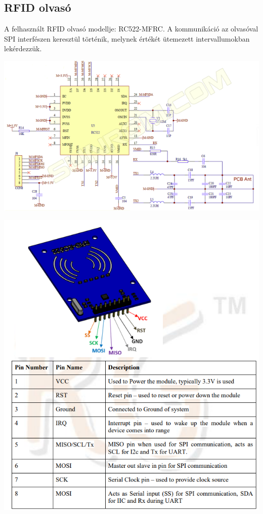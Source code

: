 \documentclass[11pt, a4paper]{article}
\begin{document}
		\subsection{RFID olvasó}
		\begin{flushleft}
			\justifying
			A felhasznált RFID olvasó modellje: RC522-MFRC. A kommunikáció az olvasóval SPI interfészen keresztül történik, melynek értékét ütemezett intervallumokban lekérdezzük.
		\end{flushleft}
			\begin{minipage}{\linewidth}
				\centering
				\includegraphics[width=0.7\linewidth]{img/rc552_shematic}
				\label{fig:3rfidschematic}
			\end{minipage}
			\begin{minipage}{\linewidth}
				\centering
				\includegraphics[width=0.7\linewidth]{img/rc552_pinout}
				\label{fig:4rfidpinout}
			\end{minipage}
			
\end{document}
